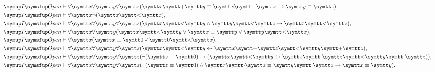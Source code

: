 \begin{Thm}
\begin{align}
		\OpenFormulaInduction & \provable \forall \obj{x} \forall \obj{y} \forall \obj{z}
		\paren{\obj{x} \obj{+} \obj{y} \objeq \obj{x} \obj{+} \obj{z} \to \obj{y} \objeq \obj{z}},
		\label{eq:iopendifference}                                                                                                                                                                        \\
		\OpenFormulaInduction & \provable \forall \obj{x}
		\lnot \paren{\obj{x} \obj{<} \obj{x}},
		\label{eq:iopennonreflexivityraw}                                                                                                                                                                 \\
		\OpenFormulaInduction & \provable \forall \obj{x} \forall \obj{y} \forall \obj{z}
		\paren{\obj{x} \obj{<} \obj{y} \land \obj{y} \obj{<} \obj{z} \to \obj{x} \obj{<} \obj{z}},
		\label{eq:iopentransitionraw}                                                                                                                                                                     \\
		\OpenFormulaInduction & \provable \forall \obj{x} \forall \obj{y}
		\paren{\obj{x} \obj{<} \obj{y} \lor \obj{x} \objeq \obj{y} \lor \obj{y} \obj{<} \obj{x}},
		\label{eq:iopenlinerorder}                                                                                                                                                                        \\
		\OpenFormulaInduction & \provable \forall \obj{x}
		\paren{\obj{x} \objeq \obj{0} \lor \obj{0} \obj{<} \obj{x}},
		\label{eq:iopen0minimum}                                                                                                                                                                          \\
		\OpenFormulaInduction & \provable \forall \obj{x} \forall \obj{y} \forall \obj{z}
		\paren{\obj{x} \obj{<} \obj{y} \formulaequiv \obj{x} \obj{+} \obj{z} \obj{<} \obj{y} \obj{+} \obj{z}},
		\label{eq:iopencalcorderaddition}                                                                                                                                                                 \\
		\OpenFormulaInduction & \provable \forall \obj{x} \forall \obj{y} \forall \obj{z}
		\paren{\lnot \paren{\obj{z} \objeq \obj{0}} \to \paren{\obj{x} \obj{<} \obj{y} \formulaequiv \obj{x} \obj{\cdot} \obj{z} \obj{<} \obj{y} \obj{\cdot} \obj{z}}},
		\label{eq:iopencalcordermult}                                                                                                                                                                     \\
		\OpenFormulaInduction & \provable \forall \obj{x} \forall \obj{y} \forall \obj{z}
		\paren{\lnot \paren{\obj{z} \objeq \obj{0}} \land \obj{x} \obj{\cdot} \obj{z} \objeq \obj{y} \obj{\cdot} \obj{z} \to \obj{x} \objeq \obj{y}}.
		\label{eq:iopendivision}
	\end{align}
\end{Thm}

